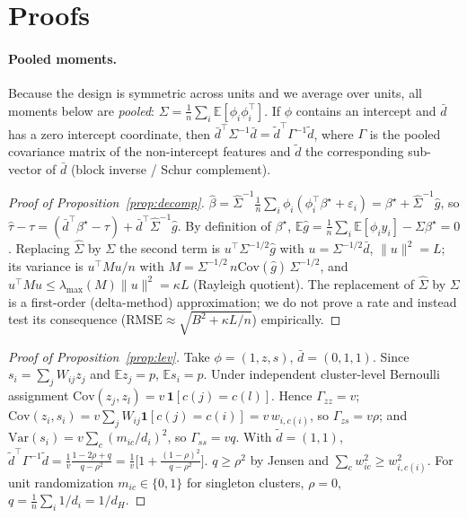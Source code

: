 \section{Proofs}
\label{app:proofs}

\paragraph{Pooled moments.} Because the design is symmetric across units and we average over units, all moments below are \emph{pooled}: $\Sigma=\frac1n\sum_i\mathbb E[\phi_i\phi_i^\top]$. If $\phi$ contains an intercept and $\bar d$ has a zero intercept coordinate, then $\bar d^\top\Sigma^{-1}\bar d=\tilde d^\top\Gamma^{-1}\tilde d$, where $\Gamma$ is the pooled covariance matrix of the non-intercept features and $\tilde d$ the corresponding sub-vector of $\bar d$ (block inverse / Schur complement).

\begin{proof}[Proof of Proposition~\ref{prop:decomp}]
$\hat\beta=\hat\Sigma^{-1}\frac1n\sum_i\phi_i(\phi_i^\top\beta^\star+\varepsilon_i)=\beta^\star+\hat\Sigma^{-1}\hat g$, so $\hat\tau-\tau=(\bar d^\top\beta^\star-\tau)+\bar d^\top\hat\Sigma^{-1}\hat g$. By definition of $\beta^\star$, $\mathbb E\hat g=\frac1n\sum_i\mathbb E[\phi_iy_i]-\Sigma\beta^\star=0$. Replacing $\hat\Sigma$ by $\Sigma$ the second term is $u^\top\Sigma^{-1/2}\hat g$ with $u=\Sigma^{-1/2}\bar d$, $\|u\|^2=L$; its variance is $u^\top M u/n$ with $M=\Sigma^{-1/2}\,n\mathrm{Cov}(\hat g)\,\Sigma^{-1/2}$, and $u^\top Mu\le\lambda_{\max}(M)\|u\|^2=\kappa L$ (Rayleigh quotient). The replacement of $\hat\Sigma$ by $\Sigma$ is a first-order (delta-method) approximation; we do not prove a rate and instead test its consequence ($\mathrm{RMSE}\approx\sqrt{B^2+\kappa L/n}$) empirically.
\end{proof}

\begin{proof}[Proof of Proposition~\ref{prop:lev}]
Take $\phi=(1,z,s)$, $\bar d=(0,1,1)$. Since $s_i=\sum_jW_{ij}z_j$ and $\mathbb E z_j=p$, $\mathbb E s_i=p$. Under independent cluster-level Bernoulli assignment $\mathrm{Cov}(z_j,z_l)=v\,\mathbf 1[c(j)=c(l)]$. Hence $\Gamma_{zz}=v$; $\mathrm{Cov}(z_i,s_i)=v\sum_jW_{ij}\mathbf 1[c(j)=c(i)]=v\,w_{i,c(i)}$, so $\Gamma_{zs}=v\rho$; and $\mathrm{Var}(s_i)=v\sum_c(m_{ic}/d_i)^2$, so $\Gamma_{ss}=vq$. With $\tilde d=(1,1)$,
$\tilde d^\top\Gamma^{-1}\tilde d=\frac1v\frac{1-2\rho+q}{q-\rho^2}=\frac1v\big[1+\frac{(1-\rho)^2}{q-\rho^2}\big]$. $q\ge\rho^2$ by Jensen and $\sum_cw_{ic}^2\ge w_{i,c(i)}^2$. For unit randomization $m_{ic}\in\{0,1\}$ for singleton clusters, $\rho=0$, $q=\frac1n\sum_i 1/d_i=1/d_H$.
\end{proof}


